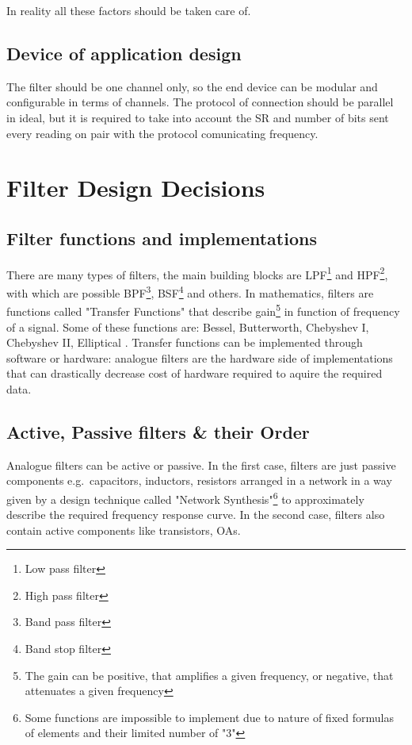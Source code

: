 \documentclass[a4paper, 10pt]{article} %
\newcommand{\parenciteit}[2]{\textit{\parencite[#1]{#2}}} %
\begin{document}
    \noindent In reality all these factors should be taken care of.

    \subsection*{Device of application design}
    \hspace{\parindent} The filter should be one channel only, so the end device can be modular and configurable in terms of channels. The protocol of connection should be parallel in ideal, but it is required to take into account the SR and number of bits sent every reading on pair with the protocol comunicating frequency.

    \section*{Filter Design Decisions}
    \subsection*{Filter functions and implementations}
    \hspace{\parindent}There are many types of filters, the main building blocks are LPF\footnote{Low pass filter} and HPF\footnote{High pass filter}, with which are possible BPF\footnote{Band pass filter}, BSF\footnote{Band stop filter} and others. In mathematics, filters are functions called "Transfer Functions" that describe gain\footnote{The gain can be positive, that amplifies a given frequency, or negative, that attenuates a given frequency} in function of frequency of a signal. Some of these functions are: Bessel, Butterworth, Chebyshev I, Chebyshev II, Elliptical \parenciteit{}{Filter:Wiki}. Transfer functions can be implemented through software or hardware: analogue filters are the hardware side of implementations that can drastically decrease cost of hardware required to aquire the required data.

    \subsection*{Active, Passive filters \& their Order}
    \hspace{\parindent}Analogue filters can be active or passive. In the first case, filters are just passive components e.g.\ capacitors, inductors, resistors arranged in a network in a way given by a design technique called "Network Synthesis"\footnote{Some functions are impossible to implement due to nature of fixed formulas of elements and their limited number of "3" }\parenciteit{}{NetworkSynthesis:Wiki} to approximately describe the required frequency response curve. In the second case, filters also contain active components like transistors, OAs.
    
\end{document}
